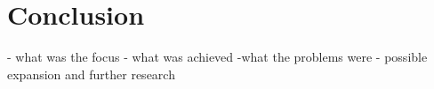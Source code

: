 \chapter*{Conclusion}
\label{chap:concl}


- what was the focus
- what was achieved
-what the problems were
- possible expansion and further research
